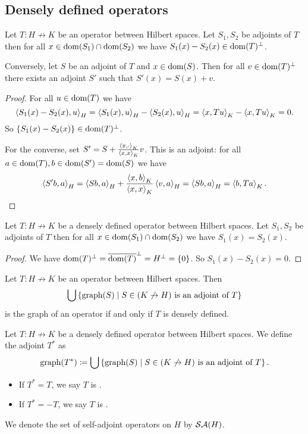 \subsection{Densely defined operators}
\begin{lemma}
Let $T: H\not\to K$ be an operator between Hilbert spaces. Let $S_1, S_2$ be adjoints of $T$ then for all $x\in \operatorname{dom}(S_1)\cap\operatorname{dom}(S_2)$ we have $S_1(x) - S_2(x) \in \operatorname{dom}(T)^\perp$.

Conversely, let $S$ be an adjoint of $T$ and $x\in\operatorname{dom}(S)$. Then for all $v\in \operatorname{dom}(T)^\perp$ there exists an adjoint $S'$ such that $S'(x) = S(x) + v$.
\end{lemma}
\begin{proof}
For all $u\in \operatorname{dom}(T)$ we have
\[ \left\langle S_1(x) - S_2(x), u \right\rangle_H = \left\langle S_1(x), u \right\rangle_H - \left\langle S_2(x), u \right\rangle_H = \left\langle x, Tu \right\rangle_K - \left\langle x, Tu \right\rangle_K = 0. \]
So $\{S_1(x) - S_2(x)\} \in \operatorname{dom}(T)^\perp$.

For the converse, set $S' = S + \frac{\left\langle x,\cdot \right\rangle_K}{\left\langle x,x \right\rangle_K}v$. This is an adjoint: for all $a\in \operatorname{dom}(T), b\in \operatorname{dom}(S') = \operatorname{dom}(S)$ we have
\[  \left\langle S' b,a \right\rangle_H = \left\langle Sb, a \right\rangle_H + \frac{\left\langle x,b \right\rangle_K}{\left\langle x,x \right\rangle_K}\left\langle v,a \right\rangle_H = \left\langle Sb, a \right\rangle_H = \left\langle b,Ta \right\rangle_K. \]
\end{proof}
\begin{corollary} \label{agreementAdjoints}
Let $T: H\not\to K$ be a densely defined operator between Hilbert spaces. Let $S_1, S_2$ be adjoints of $T$ then for all $x\in \operatorname{dom}(S_1)\cap\operatorname{dom}(S_2)$ we have $S_1(x) = S_2(x)$.
\end{corollary}
\begin{proof}
We have $\operatorname{dom}(T)^\perp = \overline{\operatorname{dom}(T)}^\perp = H^\perp = \{0\}$. So $S_1(x) - S_2(x) = 0$.
\end{proof}
\begin{corollary} \label{maximalAdjointIsOperator}
Let $T: H\not\to K$ be an operator between Hilbert spaces. Then
\[ \bigcup\left\{ \operatorname{graph}(S) \;\middle|\; \text{$S\in (K\not\to H)$ is an adjoint of $T$} \right\} \]
is the graph of an operator \textup{if and only if} $T$ is densely defined.
\end{corollary}

\begin{definition}
Let $T: H\not\to K$ be a densely defined operator between Hilbert spaces. We define the adjoint $T^*$ as
\[ \operatorname{graph}(T^*) \coloneqq \bigcup\left\{ \operatorname{graph}(S) \;\middle|\; \text{$S\in (K\not\to H)$ is an adjoint of $T$} \right\}. \]
\begin{itemize}
\item If $T^* = T$, we say $T$ is .
\item If $T^* = -T$, we say $T$ is .
\end{itemize}
We denote the set of self-adjoint operators on $H$ by $\mathop{\mathcal{SA}}\nolimits(H)$.
\end{definition}


